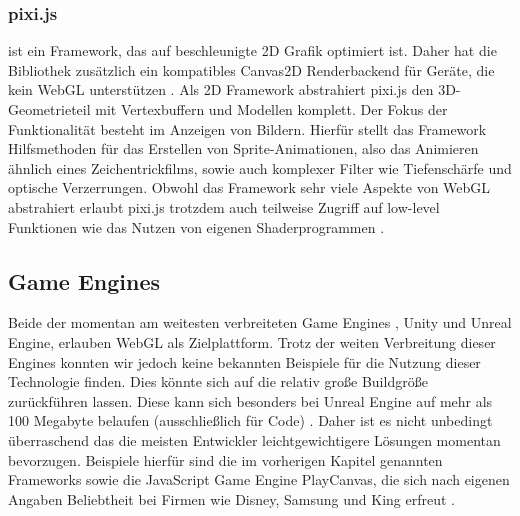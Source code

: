 \subsubsection*{pixi.js}\cite{pixiGithub} ist ein Framework, das auf beschleunigte 2D Grafik optimiert ist. Daher hat die Bibliothek zusätzlich ein kompatibles Canvas2D Renderbackend für Geräte, die kein WebGL unterstützen \cite{pixiGithub}. Als 2D Framework abstrahiert pixi.js den 3D-Geometrieteil mit Vertexbuffern und Modellen komplett. Der Fokus der Funktionalität besteht im Anzeigen von Bildern. Hierfür stellt das Framework Hilfsmethoden für das Erstellen von Sprite-Animationen, also das Animieren ähnlich eines Zeichentrickfilms, sowie auch komplexer Filter wie Tiefenschärfe und optische Verzerrungen. Obwohl das Framework sehr viele Aspekte von WebGL abstrahiert erlaubt pixi.js trotzdem auch teilweise Zugriff auf low-level Funktionen wie das Nutzen von eigenen Shaderprogrammen \cite{pixiShaders}.
\subsection{Game Engines}
Beide der momentan am weitesten verbreiteten Game Engines \cite{UnityDist}\cite{EngineDist}, Unity und Unreal Engine, erlauben WebGL als Zielplattform. Trotz der weiten Verbreitung dieser Engines konnten wir jedoch keine bekannten Beispiele für die Nutzung dieser Technologie finden. Dies könnte sich auf die relativ große Buildgröße zurückführen lassen. Diese kann sich besonders bei Unreal Engine auf mehr als 100 Megabyte belaufen (ausschließlich für Code) \cite{unrealFileSize}. Daher ist es nicht unbedingt überraschend das die meisten Entwickler leichtgewichtigere Lösungen momentan bevorzugen. Beispiele hierfür sind die im vorherigen Kapitel genannten Frameworks sowie die JavaScript Game Engine PlayCanvas, die sich nach eigenen Angaben Beliebtheit bei Firmen wie Disney, Samsung und King erfreut \cite{playCanGithub}.
